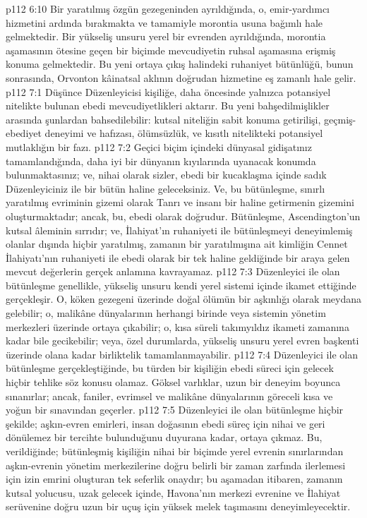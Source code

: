 \vs p112 6:10 Bir yaratılmış özgün gezegeninden ayrıldığında, o, emir\hyp{}yardımcı hizmetini ardında bırakmakta ve tamamiyle morontia usuna bağımlı hale gelmektedir. Bir yükseliş unsuru yerel bir evrenden ayrıldığında, morontia aşamasının ötesine geçen bir biçimde mevcudiyetin ruhsal aşamasına erişmiş konuma gelmektedir. Bu yeni ortaya çıkış halindeki ruhaniyet bütünlüğü, bunun sonrasında, Orvonton kâinatsal aklının doğrudan hizmetine eş zamanlı hale gelir.
\vs p112 7:1 Düşünce Düzenleyicisi kişiliğe, daha öncesinde yalnızca potansiyel nitelikte bulunan ebedi mevcudiyetlikleri aktarır. Bu yeni bahşedilmişlikler arasında şunlardan bahsedilebilir: kutsal niteliğin sabit konuma getirilişi, geçmiş\hyp{}ebediyet deneyimi ve hafızası, ölümsüzlük, ve kısıtlı nitelikteki potansiyel mutlaklığın bir fazı.
\vs p112 7:2 Geçici biçim içindeki dünyasal gidişatınız tamamlandığında, daha iyi bir dünyanın kıyılarında uyanacak konumda bulunmaktasınız; ve, nihai olarak sizler, ebedi bir kucaklaşma içinde sadık Düzenleyiciniz ile bir bütün haline geleceksiniz. Ve, bu bütünleşme, sınırlı yaratılmış evriminin gizemi olarak Tanrı ve insanı bir haline getirmenin gizemini oluşturmaktadır; ancak, bu, ebedi olarak doğrudur. Bütünleşme, Ascendington’un kutsal âleminin sırrıdır; ve, İlahiyat’ın ruhaniyeti ile bütünleşmeyi deneyimlemiş olanlar dışında hiçbir yaratılmış, zamanın bir yaratılmışına ait kimliğin Cennet İlahiyatı’nın ruhaniyeti ile ebedi olarak bir tek haline geldiğinde bir araya gelen mevcut değerlerin gerçek anlamına kavrayamaz.
\vs p112 7:3 Düzenleyici ile olan bütünleşme genellikle, yükseliş unsuru kendi yerel sistemi içinde ikamet ettiğinde gerçekleşir. O, köken gezegeni üzerinde doğal ölümün bir aşkınlığı olarak meydana gelebilir; o, malikâne dünyalarının herhangi birinde veya sistemin yönetim merkezleri üzerinde ortaya çıkabilir; o, kısa süreli takımyıldız ikameti zamanına kadar bile gecikebilir; veya, özel durumlarda, yükseliş unsuru yerel evren başkenti üzerinde olana kadar birliktelik tamamlanmayabilir.
\vs p112 7:4 Düzenleyici ile olan bütünleşme gerçekleştiğinde, bu türden bir kişiliğin ebedi süreci için gelecek hiçbir tehlike söz konusu olamaz. Göksel varlıklar, uzun bir deneyim boyunca sınanırlar; ancak, faniler, evrimsel ve malikâne dünyalarının göreceli kısa ve yoğun bir sınavından geçerler.
\vs p112 7:5 Düzenleyici ile olan bütünleşme hiçbir şekilde; aşkın\hyp{}evren emirleri, insan doğasının ebedi süreç için nihai ve geri dönülemez bir tercihte bulunduğunu duyurana kadar, ortaya çıkmaz. Bu, verildiğinde; bütünleşmiş kişiliğin nihai bir biçimde yerel evrenin sınırlarından aşkın\hyp{}evrenin yönetim merkezilerine doğru belirli bir zaman zarfında ilerlemesi için izin emrini oluşturan tek seferlik onaydır; bu aşamadan itibaren, zamanın kutsal yolucusu, uzak gelecek içinde, Havona’nın merkezi evrenine ve İlahiyat serüvenine doğru uzun bir uçuş için yüksek melek taşımasını deneyimleyecektir.
